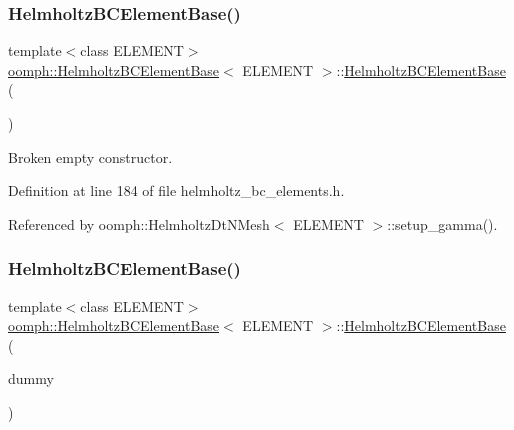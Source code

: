 \subsubsection{\texorpdfstring{Helmholtz\+B\+C\+Element\+Base()}{HelmholtzBCElementBase()}\hspace{0.1cm}{\footnotesize\ttfamily [2/3]}}
{\footnotesize\ttfamily template$<$class E\+L\+E\+M\+E\+NT$>$ \\
\hyperlink{classoomph_1_1HelmholtzBCElementBase}{oomph\+::\+Helmholtz\+B\+C\+Element\+Base}$<$ E\+L\+E\+M\+E\+NT $>$\+::\hyperlink{classoomph_1_1HelmholtzBCElementBase}{Helmholtz\+B\+C\+Element\+Base} (\begin{DoxyParamCaption}{ }\end{DoxyParamCaption})\hspace{0.3cm}{\ttfamily [inline]}}



Broken empty constructor. 



Definition at line 184 of file helmholtz\+\_\+bc\+\_\+elements.\+h.



Referenced by oomph\+::\+Helmholtz\+Dt\+N\+Mesh$<$ E\+L\+E\+M\+E\+N\+T $>$\+::setup\+\_\+gamma().

\mbox{\label{classoomph_1_1HelmholtzBCElementBase_a29f6e4cfef6066d637f0eea0e2253075}} 
\subsubsection{\texorpdfstring{Helmholtz\+B\+C\+Element\+Base()}{HelmholtzBCElementBase()}\hspace{0.1cm}{\footnotesize\ttfamily [3/3]}}
{\footnotesize\ttfamily template$<$class E\+L\+E\+M\+E\+NT$>$ \\
\hyperlink{classoomph_1_1HelmholtzBCElementBase}{oomph\+::\+Helmholtz\+B\+C\+Element\+Base}$<$ E\+L\+E\+M\+E\+NT $>$\+::\hyperlink{classoomph_1_1HelmholtzBCElementBase}{Helmholtz\+B\+C\+Element\+Base} (\begin{DoxyParamCaption}\item[{const \hyperlink{classoomph_1_1HelmholtzBCElementBase}{Helmholtz\+B\+C\+Element\+Base}$<$ E\+L\+E\+M\+E\+NT $>$ \&}]{dummy }\end{DoxyParamCaption})\hspace{0.3cm}{\ttfamily [inline]}}



